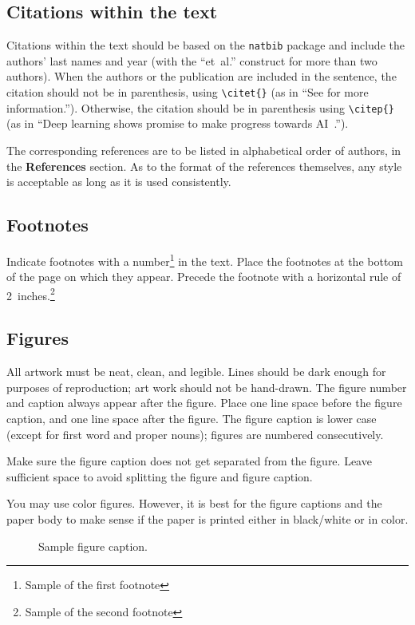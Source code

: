 \documentclass[10pt]{article} %
\begin{document}
\subsection{Citations within the text}

Citations within the text should be based on the \texttt{natbib} package
and include the authors' last names and year (with the ``et~al.'' construct
for more than two authors). When the authors or the publication are
included in the sentence, the citation should not be in parenthesis, using \verb|\citet{}| (as
in ``See \citet{Hinton06} for more information.''). Otherwise, the citation
should be in parenthesis using \verb|\citep{}| (as in ``Deep learning shows promise to make progress
towards AI~\citep{Bengio+chapter2007}.'').

The corresponding references are to be listed in alphabetical order of
authors, in the \textbf{References} section. As to the format of the
references themselves, any style is acceptable as long as it is used
consistently.

\subsection{Footnotes}

Indicate footnotes with a number\footnote{Sample of the first footnote} in the
text. Place the footnotes at the bottom of the page on which they appear.
Precede the footnote with a horizontal rule of 2~inches.\footnote{Sample of the second footnote}

\subsection{Figures}

All artwork must be neat, clean, and legible. Lines should be dark
enough for purposes of reproduction; art work should not be
hand-drawn. The figure number and caption always appear after the
figure. Place one line space before the figure caption, and one line
space after the figure. The figure caption is lower case (except for
first word and proper nouns); figures are numbered consecutively.

Make sure the figure caption does not get separated from the figure.
Leave sufficient space to avoid splitting the figure and figure caption.

You may use color figures.
However, it is best for the
figure captions and the paper body to make sense if the paper is printed
either in black/white or in color.
\begin{figure}[h]
\begin{center}
\fbox{\rule[-.5cm]{0cm}{4cm} \rule[-.5cm]{4cm}{0cm}}
\end{center}
\caption{Sample figure caption.}
\end{figure}
\end{document}

